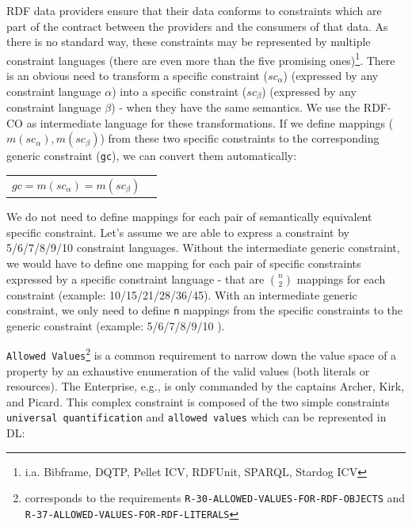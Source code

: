 \documentclass{llncs}
\newcommand{\ms}[1]{\texttt{#1}}
\newenvironment{DL}{
  \vspace{0.3cm}
	\begin{center}
  \begin{tabular}{r l}

}{
  \end{tabular}
	\end{center}
}
\begin{document}
RDF data providers ensure that their data conforms to constraints which are part of the contract between the providers and the consumers of that data.
As there is no standard way, these constraints may be represented by multiple constraint languages (there are even more than the five promising ones)\footnote{i.a. Bibframe, DQTP, Pellet ICV, RDFUnit, SPARQL, Stardog ICV}.
There is an obvious need to transform a specific constraint (\ms{$sc_{\alpha}$}) (expressed by any constraint language \ms{$\alpha$}) into a specific constraint (\ms{$sc_{\beta}$}) (expressed by any constraint language \ms{$\beta$}) - when they have the same semantics.
We use the RDF-CO as intermediate language for these transformations.
If we define mappings ($m(sc_{\alpha}), m(sc_{\beta})$) from these two specific constraints to the corresponding generic constraint (\ms{gc}),
we can convert them automatically:

\begin{DL}
$ gc = m(sc_{\alpha}) = m(sc_{\beta}) $
\end{DL}

We do not need to define mappings for each pair of semantically equivalent specific constraint.
Let's assume we are able to express a constraint by 5/6/7/8/9/10 constraint languages.
Without the intermediate generic constraint, we would have to define one mapping for each pair of specific constraints expressed by a specific constraint language
- that are \ms{\( {n \choose 2} \)} mappings for each constraint (example: 10/15/21/28/36/45).
With an intermediate generic constraint, we only need to define \ms{n} mappings from the specific constraints to the generic constraint (example: 5/6/7/8/9/10 ).



\ms{Allowed Values}\footnote{corresponds to the requirements \ms{R-30-ALLOWED-VALUES-FOR-RDF-OBJECTS} and \ms{R-37-ALLOWED-VALUES-FOR-RDF-LITERALS}}
is a common requirement to narrow down the value space of a property by an exhaustive enumeration of the valid values (both literals or resources). 
The Enterprise, e.g., is only commanded by the captains Archer, Kirk, and Picard.
This complex constraint is composed of the two simple constraints \ms{universal quantification} and \ms{allowed values} which can be represented in DL:
\end{document}
